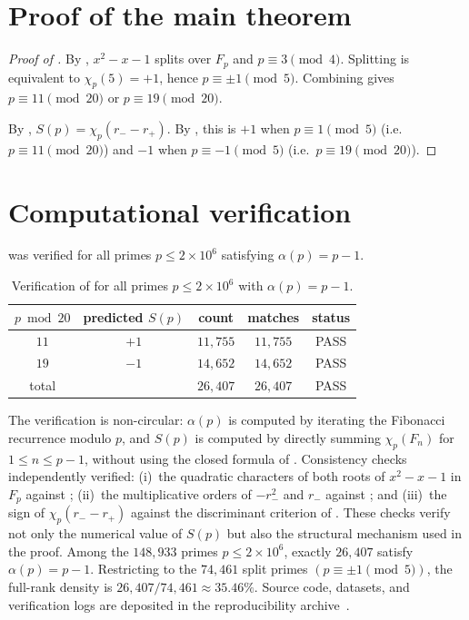 \documentclass[preprint,5p,times,twocolumn]{elsarticle}
\def\F{F}\def\Z{Z}\def\Q{Q}\def\R{R}\def\N{N}%
\newcommand{\Z}{\mathbb{Z}}
\newcommand{\Q}{\mathbb{Q}}
\newcommand{\R}{\mathbb{R}}
\newcommand{\F}{\mathbb{F}}
\newcommand{\N}{\mathbb{N}}
\begin{document}
\section{Proof of the main theorem}\label{sec:main-proof}

\begin{proof}[Proof of ]
By , $x^2-x-1$ splits over $\F_p$ and 
$p\equiv3\pmod4$. Splitting is equivalent to $\chi_p(5)=+1$, 
hence $p\equiv\pm1\pmod5$. Combining gives 
$p\equiv11\pmod{20}$ or $p\equiv19\pmod{20}$.

By , $S(p)=\chi_p(r_- - r_+)$. By 
, this is $+1$ when $p\equiv1\pmod5$ 
(i.e.\ $p\equiv11\pmod{20}$) and $-1$ when $p\equiv-1\pmod5$ 
(i.e.\ $p\equiv19\pmod{20}$).
\end{proof}

\section{Computational verification}\label{sec:computations}

 was verified for all primes $p\le2\times10^6$ 
satisfying $\alpha(p)=p-1$.

\begin{table}[ht]\centering
\caption{Verification of  for all primes 
  \(p\le 2\times10^6\) with \(\alpha(p)=p-1\).}\label{tab:verification}
\begin{tabular}{ccccc}\toprule
$p\bmod 20$ & predicted $S(p)$ & count & matches & status\\
\midrule
$11$ & $+1$ & $11{,}755$ & $11{,}755$ & PASS\\
$19$ & $-1$ & $14{,}652$ & $14{,}652$ & PASS\\
\midrule
total &     & $26{,}407$ & $26{,}407$ & PASS\\
\bottomrule
\end{tabular}\end{table}

The verification is non-circular: $\alpha(p)$ is computed by 
iterating the Fibonacci recurrence modulo $p$, and $S(p)$ is 
computed by directly summing $\chi_p(F_n)$ for $1\le n\le p-1$, 
without using the closed formula of . Consistency 
checks independently verified: (i)~the quadratic characters of 
both roots of $x^2-x-1$ in $\F_p$ against ; 
(ii)~the multiplicative orders of $-r_-^2$ and $r_-$ against 
; and (iii)~the sign of 
$\chi_p(r_- - r_+)$ against the discriminant criterion of 
. These checks verify not only the numerical value 
of $S(p)$ but also the structural mechanism used in the proof.
Among the \(148{,}933\) primes \(p\le 2\times10^6\), exactly
\(26{,}407\) satisfy \(\alpha(p)=p-1\). Restricting to the
\(74{,}461\) split primes \((p\equiv\pm1\pmod5)\), the full-rank
density is \(26{,}407/74{,}461\approx35.46\%\). Source code,
datasets, and verification logs are deposited in the
reproducibility archive~\cite{Ghandali2026}.
\end{document}
